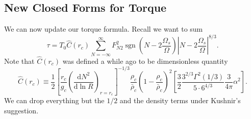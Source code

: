 \documentclass[11pt,
        usenames, %
        dvipsnames %
    ]{article}
\newcommand*{\rd}[2]{\frac{\mathrm{d}#1}{\mathrm{d}#2}}
\newcommand*{\abs}[1]{\left|#1\right|}
\newcommand*{\p}[1]{\left(#1\right)}
\newcommand*{\s}[1]{\left[#1\right]}
\DeclareMathOperator{\sgn}{sgn}
\begin{document}


\subsection{New Closed Forms for Torque}

We can now update our torque formula. Recall we want to sum
\begin{equation}
    \tau = T_0 \hat{C}(r_c)
            \sum\limits_{N = -\infty}^\infty
                F_{N2}^2 \sgn\p{N - 2\frac{\Omega_s}{\Omega}}
                    \abs{N - 2\frac{\Omega_s}{\Omega}}^{8/3}.
\end{equation}
Note that $\hat{C}(r_c)$ was defined a while ago to be dimensionless quantity
\begin{equation}
    \hat{C}(r_c) \equiv \frac{1}{2}
        \s{\frac{r_c}{g_c}\p{\rd{N^2}{\ln R}}_{r = r_c}}^{-1/3}
            \frac{\rho_c}{\bar{\rho}_c} \p{1 - \frac{\rho_c}{\bar{\rho}_c}}^2
            \s{\frac{3}{2}\frac{3^{2/3}\Gamma^2(1/3)}{5 \cdot
                6^{4/3}} \frac{3}{4\pi}\alpha^2}.
\end{equation}
We can drop everything but the $1/2$ and the density terms under Kushnir's
suggestion.
\end{document}

